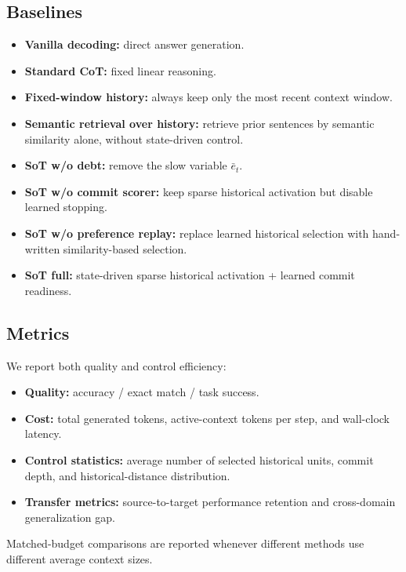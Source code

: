\documentclass{article}
\begin{document}
\subsection{Baselines}
\begin{itemize}[leftmargin=1.3em, itemsep=0.2em]
    \item \textbf{Vanilla decoding:} direct answer generation.
    \item \textbf{Standard CoT:} fixed linear reasoning.
    \item \textbf{Fixed-window history:} always keep only the most recent context window.
    \item \textbf{Semantic retrieval over history:} retrieve prior sentences by semantic similarity alone, without state-driven control.
    \item \textbf{SoT w/o debt:} remove the slow variable $\bar e_t$.
    \item \textbf{SoT w/o commit scorer:} keep sparse historical activation but disable learned stopping.
    \item \textbf{SoT w/o preference replay:} replace learned historical selection with hand-written similarity-based selection.
    \item \textbf{SoT full:} state-driven sparse historical activation + learned commit readiness.
\end{itemize}

\subsection{Metrics}
We report both quality and control efficiency:
\begin{itemize}[leftmargin=1.3em, itemsep=0.2em]
    \item \textbf{Quality:} accuracy / exact match / task success.
    \item \textbf{Cost:} total generated tokens, active-context tokens per step, and wall-clock latency.
    \item \textbf{Control statistics:} average number of selected historical units, commit depth, and historical-distance distribution.
    \item \textbf{Transfer metrics:} source-to-target performance retention and cross-domain generalization gap.
\end{itemize}
Matched-budget comparisons are reported whenever different methods use different average context sizes.
\end{document}
